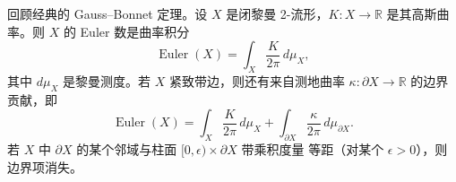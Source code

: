 \documentclass[11pt]{amsart}
\theoremstyle{definition}
\theoremstyle{remark}
\theoremstyle{plain}
\numberwithin{equation}{section}
\renewcommand{\:}{\colon}
\newcommand{\RR}{{\mathbb R}}
\DeclareMathOperator{\Euler}{Euler}
\newcommand{\bX}{\partial X}
\begin{document}
回顾经典的 Gauss–Bonnet 定理。设 $X$ 是闭黎曼 2-流形，$K\:X\to\RR$
是其高斯曲率。则 $X$ 的 Euler 数是曲率积分
  \begin{equation}\label{eq:84}
     \Euler(X) = \int_{X}\frac{K}{2\pi }\,d\mu _X, 
  \end{equation}
其中 $d\mu _X$ 是黎曼测度。若 $X$ 紧致带边，则还有来自测地曲率
$\kappa \:\bX\to\RR$ 的边界贡献，即
  \begin{equation}\label{eq:85}
     \Euler(X) = \int_{X}\frac{K}{2\pi }\,d\mu _X + \int_{\bX}\frac{\kappa
     }{2\pi }\,d\mu _{\bX}. 
  \end{equation}
若 $X$ 中 $\bX$ 的某个邻域与柱面 $[0,\epsilon )\times \bX$ 带乘积度量
等距（对某个 $\epsilon >0$），则边界项消失。
\end{document}
